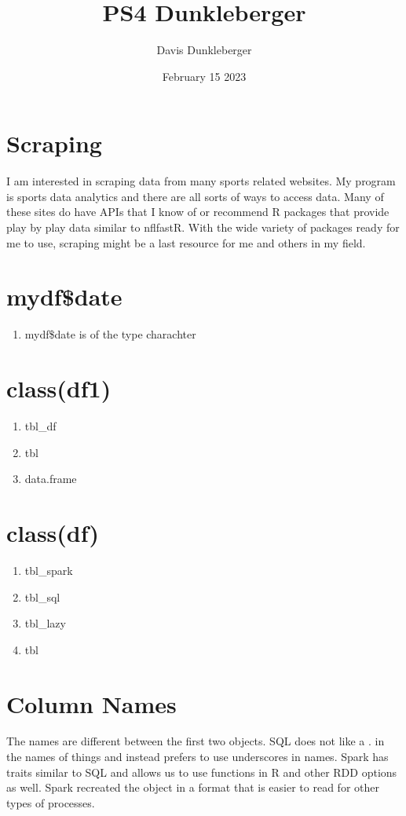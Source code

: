 \documentclass{article}
\title{PS4 Dunkleberger}
\author{Davis Dunkleberger}
\date{February 15 2023}
\begin{document}
\maketitle

\section{Scraping}

I am interested in scraping data from many sports related websites. My program is sports data analytics and there are all sorts of ways to access data. Many of these sites do have APIs that I know of or recommend R packages that provide play by play data similar to nflfastR. With the wide variety of packages ready for me to use, scraping might be a last resource for me and others in my field. 

\section{mydf\$date}
\begin{enumerate}
    \item mydf\$date is of the type charachter
\end{enumerate}

\section{class(df1)}
\begin{enumerate}
    \item tbl\_df 
    \item tbl 
    \item data.frame
\end{enumerate}

\section{class(df)}
\begin{enumerate}
    \item tbl\_spark 
    \item tbl\_sql 
    \item tbl\_lazy
    \item tbl
\end{enumerate}

\section{Column Names}
The names are different between the first two objects. SQL does not like a . in the names of things and instead prefers to use underscores in names. Spark has traits similar to SQL and allows us to use functions in R and other RDD options as well. Spark recreated the object in a format that is easier to read for other types of processes. 
\end{document}
